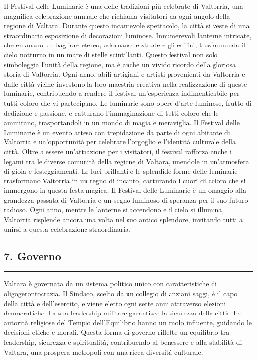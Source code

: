 Il Festival delle Luminarie è una delle tradizioni più celebrate di
Valtorria, una magnifica celebrazione annuale che richiama visitatori da
ogni angolo della regione di Valtara. Durante questo incantevole
spettacolo, la città si veste di una straordinaria esposizione di
decorazioni luminose. Innumerevoli lanterne intricate, che emanano un
bagliore etereo, adornano le strade e gli edifici, trasformando il cielo
notturno in un mare di stelle scintillanti. Questo festival non solo
simboleggia l'unità della regione, ma è anche un vivido ricordo della
gloriosa storia di Valtorria. Ogni anno, abili artigiani e artisti
provenienti da Valtorria e dalle città vicine investono la loro maestria
creativa nella realizzazione di queste luminarie, contribuendo a rendere
il festival un'esperienza indimenticabile per tutti coloro che vi
partecipano. Le luminarie sono opere d'arte luminose, frutto di
dedizione e passione, e catturano l'immaginazione di tutti coloro che le
ammirano, trasportandoli in un mondo di magia e meraviglia. Il Festival
delle Luminarie è un evento atteso con trepidazione da parte di ogni
abitante di Valtorria e un'opportunità per celebrare l'orgoglio e
l'identità culturale della città. Oltre a essere un'attrazione per i
visitatori, il festival rafforza anche i legami tra le diverse comunità
della regione di Valtara, unendole in un'atmosfera di gioia e
festeggiamenti. Le luci brillanti e le splendide forme delle luminarie
trasformano Valtorria in un regno di incanto, catturando i cuori di
coloro che si immergono in questa festa magica. Il Festival delle
Luminarie è un omaggio alla grandezza passata di Valtorria e un segno
luminoso di speranza per il suo futuro radioso. Ogni anno, mentre le
lanterne si accendono e il cielo si illumina, Valtorria risplende ancora
una volta nel suo antico splendore, invitando tutti a unirsi a questa
celebrazione straordinaria.

\subsection{7. Governo}\label{governo}

\begin{center}\rule{0.5\linewidth}{0.5pt}\end{center}

Valtara è governata da un sistema politico unico con caratteristiche di
oligogerontocrazia. Il Sindaco, scelto da un collegio di anziani saggi,
è il capo della città e dell'esercito, e viene eletto ogni sette anni
attraverso elezioni democratiche. La sua leadership militare garantisce
la sicurezza della città. Le autorità religiose del Tempio
dell'Equilibrio hanno un ruolo influente, guidando le decisioni etiche e
morali. Questa forma di governo riflette un equilibrio tra leadership,
sicurezza e spiritualità, contribuendo al benessere e alla stabilità di
Valtara, una prospera metropoli con una ricca diversità culturale.

